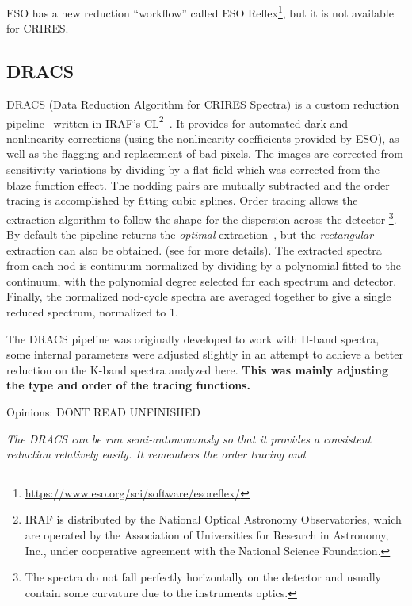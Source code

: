 ESO has a new reduction ``workflow'' called ESO Reflex\footnote{\href{https://www.eso.org/sci/software/esoreflex/}{https://www.eso.org/sci/software/esoreflex/}}, but it is not available for CRIRES.

\subsection{DRACS}
DRACS (Data Reduction Algorithm for CRIRES Spectra) is a custom reduction pipeline~\citep{figueira_radial_2010} written in IRAF's CL\footnote{IRAF is distributed by the National Optical Astronomy Observatories, which are operated by the Association of Universities for Research in Astronomy, {Inc.}, under cooperative agreement with the National Science Foundation.}~\citep{tody_iraf_1993}. It provides for automated dark and nonlinearity corrections (using the nonlinearity coefficients provided by ESO), as well as the flagging and replacement of bad pixels. The images are corrected from sensitivity variations by dividing by a flat-field which was corrected from the blaze function effect. The nodding pairs are mutually subtracted and the order tracing is accomplished by fitting cubic splines. Order tracing allows the extraction algorithm to follow the shape for the dispersion across the detector \footnote{The spectra do not fall perfectly horizontally on the detector and usually contain some curvature due to the instruments optics.}. 
By default the pipeline returns the \emph{optimal }extraction~\citep{horne_optimal_1986}, but the \emph{rectangular} extraction can also be obtained. (see  for more details).
The extracted spectra from each nod is continuum normalized by dividing by a polynomial fitted to the continuum, with the polynomial degree selected for each spectrum and detector. Finally, the normalized nod-cycle spectra are averaged together to give a single reduced spectrum, normalized to 1.

The DRACS pipeline was originally developed to work with H-band spectra, some internal parameters were adjusted slightly in an attempt to achieve a better reduction on the K-band spectra analyzed here. \textbf{This was mainly adjusting the type and order of the tracing functions.}


Opinions:
DONT READ UNFINISHED 

\textit{The DRACS can be run semi-autonomously so that it provides a consistent reduction relatively easily. It remembers the order tracing and}

